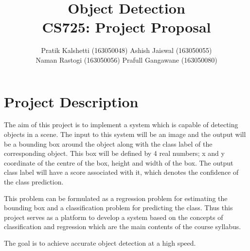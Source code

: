 \documentclass[12pt]{article}
\begin{document}
	\title{\textbf{Object Detection}\\
		\small{CS725: Project Proposal}}
	\author{
			Pratik Kalshetti (163050048) \hfill 
			Ashish Jaiswal (163050055)\\
			Naman Rastogi (163050056) \hfill
			Prafull Gangawane (163050080)	}
	\date{}
	\maketitle
	
	\section*{Project Description}
	The aim of this project is to implement a system which is capable of detecting objects in a scene. The input to this system will be an image and the output will be a bounding box around the object along with the class label of the corresponding object. This box will be defined by 4 real numbers; x and y coordinate of the centre of the box, height and width of the box. The output class label will have a score associated with it, which denotes the confidence of the class prediction.
	
	This problem can be formulated as a regression problem for estimating the bounding box and a classification problem for predicting the class. Thus this project serves as a platform to develop a system based on the concepts of classification and regression which are the main contents of the course syllabus.
	
	The goal is to achieve accurate object detection at a high speed. 
	
\end{document}
